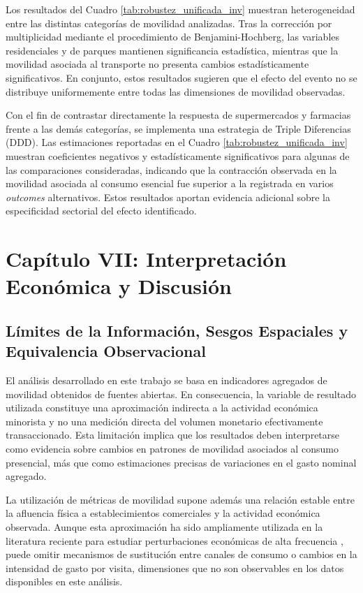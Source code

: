 Los resultados del Cuadro \ref{tab:robustez_unificada_inv} muestran heterogeneidad entre las distintas categor\'ias de movilidad analizadas. Tras la correcci\'on por multiplicidad mediante el procedimiento de Benjamini-Hochberg, las variables residenciales y de parques mantienen significancia estad\'istica, mientras que la movilidad asociada al transporte no presenta cambios estad\'isticamente significativos. En conjunto, estos resultados sugieren que el efecto del evento no se distribuye uniformemente entre todas las dimensiones de movilidad observadas.

Con el fin de contrastar directamente la respuesta de supermercados y farmacias frente a las dem\'as categor\'ias, se implementa una estrategia de Triple Diferencias (DDD). Las estimaciones reportadas en el Cuadro \ref{tab:robustez_unificada_inv} muestran coeficientes negativos y estad\'isticamente significativos para algunas de las comparaciones consideradas, indicando que la contracci\'on observada en la movilidad asociada al consumo esencial fue superior a la registrada en varios \textit{outcomes} alternativos. Estos resultados aportan evidencia adicional sobre la especificidad sectorial del efecto identificado.

\newpage
\section{Cap\'itulo VII: Interpretaci\'on Econ\'omica y Discusi\'on}\label{chp:capitulo7}

\subsection{L\'imites de la Informaci\'on, Sesgos Espaciales y Equivalencia Observacional}
\label{sec:7_1}

El an\'alisis desarrollado en este trabajo se basa en indicadores agregados de movilidad obtenidos de fuentes abiertas. En consecuencia, la variable de resultado utilizada constituye una aproximaci\'on indirecta a la actividad econ\'omica minorista y no una medici\'on directa del volumen monetario efectivamente transaccionado. Esta limitaci\'on implica que los resultados deben interpretarse como evidencia sobre cambios en patrones de movilidad asociados al consumo presencial, m\'as que como estimaciones precisas de variaciones en el gasto nominal agregado.

La utilizaci\'on de m\'etricas de movilidad supone adem\'as una relaci\'on estable entre la afluencia f\'isica a establecimientos comerciales y la actividad econ\'omica observada. Aunque esta aproximaci\'on ha sido ampliamente utilizada en la literatura reciente para estudiar perturbaciones econ\'omicas de alta frecuencia \citep{chetty2020economic, bounie2020consumers}, puede omitir mecanismos de sustituci\'on entre canales de consumo o cambios en la intensidad de gasto por visita, dimensiones que no son observables en los datos disponibles en este an\'alisis.

